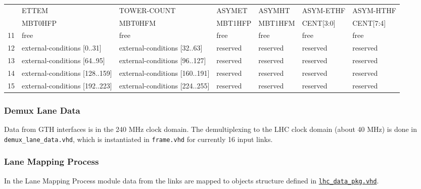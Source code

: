 \begin{table}
\begin{tabular}{c|m{}|m{}|m{}|m{}|m{}|m{}|}
\multicolumn{1}{|c|}{} &
\multicolumn{1}{l|}{ETTEM} & TOWER-COUNT & ASYMET & ASYMHT & ASYM-ETHF & ASYM-HTHF \\
\multicolumn{1}{|c|}{} &
\multicolumn{1}{l|}{MBT0HFP} & MBT0HFM & MBT1HFP & MBT1HFM & CENT[3:0] & CENT[7:4] \\\hline
\multicolumn{1}{|c|}{11} & free & free & free & free & free & free \\\hline
\multicolumn{1}{|c|}{12} & external-conditions [0..31] & external-conditions [32..63] & reserved & reserved & reserved & reserved \\\hline
\multicolumn{1}{|c|}{13} & external-conditions [64..95] & external-conditions [96..127] & reserved & reserved & reserved & reserved \\\hline
\multicolumn{1}{|c|}{14} & external-conditions [128..159] & external-conditions [160..191] & reserved & reserved & reserved & reserved \\\hline
\multicolumn{1}{|c|}{15} & external-conditions [192..223] & external-conditions [224..255] & reserved & reserved & reserved & reserved \\\hline
\end{tabular}
\label{tab:framework:tab_configuration_optical_conn}
\end{table}

\clearpage

%
%

\subsubsection{Demux Lane Data} \label{sec:framework:demux_lane_data}
Data from GTH interfaces is in the 240 MHz clock domain. The demultiplexing to the LHC clock domain (about 40 MHz) is done in \texttt{demux\_lane\_data.vhd}, which is instantiated in \texttt{frame.vhd} for currently 16 input links.

%
%

\subsubsection{Lane Mapping Process} \label{sec:framework:lmp}
In the Lane Mapping Process module data from the links are mapped to objects structure defined in \href{https://github.com/cms-l1-globaltrigger/mp7_ugt_legacy/blob/master/firmware/hdl/packages/lhc_data_pkg.vhd}{\texttt{lhc\_data\_pkg.vhd}}.

